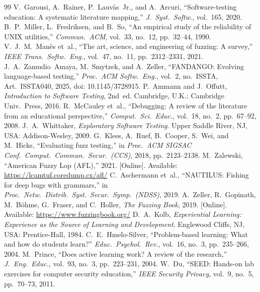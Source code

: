 \documentclass[conference]{IEEEtran}
\begin{document}
\balance

\begin{thebibliography}{99}
 V.~Garousi, A.~Rainer, P.~Lauv\aa{}s~Jr., and A.~Arcuri, ``Software-testing education: A systematic literature mapping,'' \emph{J.\ Syst.\ Softw.}, vol.~165, 2020.
 B.~P.~Miller, L.~Fredriksen, and B.~So, ``An empirical study of the reliability of UNIX utilities,'' \emph{Commun.\ ACM}, vol.~33, no.~12, pp.~32--44, 1990.
 V.~J.~M.~Man\`{e}s et~al., ``The art, science, and engineering of fuzzing: A survey,'' \emph{IEEE Trans.\ Softw.\ Eng.}, vol.~47, no.~11, pp.~2312--2331, 2021.
 J.~A.~Zamudio~Amaya, M.~Smytzek, and A.~Zeller, ``FANDANGO: Evolving language-based testing,'' \emph{Proc.\ ACM Softw.\ Eng.}, vol.~2, no.~ISSTA, Art.~ISSTA040, 2025, doi: 10.1145/3728915.
 P.~Ammann and J.~Offutt, \emph{Introduction to Software Testing}, 2nd~ed. Cambridge, U.K.: Cambridge Univ.\ Press, 2016.
 R.~McCauley et~al., ``Debugging: A review of the literature from an educational perspective,'' \emph{Comput.\ Sci.\ Educ.}, vol.~18, no.~2, pp.~67--92, 2008.
 J.~A.~Whittaker, \emph{Exploratory Software Testing}. Upper Saddle River, NJ, USA: Addison-Wesley, 2009.
 G.~Klees, A.~Ruef, B.~Cooper, S.~Wei, and M.~Hicks, ``Evaluating fuzz testing,'' in \emph{Proc.\ ACM SIGSAC Conf.\ Comput.\ Commun.\ Secur.\ (CCS)}, 2018, pp.~2123--2138.
 M.~Zalewski, ``American Fuzzy Lop (AFL),'' 2021. [Online]. Available: \url{https://lcamtuf.coredump.cx/afl/}
 C.~Aschermann et~al., ``NAUTILUS: Fishing for deep bugs with grammars,'' in \emph{Proc.\ Netw.\ Distrib.\ Syst.\ Secur.\ Symp.\ (NDSS)}, 2019.
 A.~Zeller, R.~Gopinath, M.~B\"{o}hme, G.~Fraser, and C.~Holler, \emph{The Fuzzing Book}, 2019. [Online]. Available: \url{https://www.fuzzingbook.org/}
 D.~A.~Kolb, \emph{Experiential Learning: Experience as the Source of Learning and Development}. Englewood Cliffs, NJ, USA: Prentice-Hall, 1984.
 C.~E.~Hmelo-Silver, ``Problem-based learning: What and how do students learn?'' \emph{Educ.\ Psychol.\ Rev.}, vol.~16, no.~3, pp.~235--266, 2004.
 M.~Prince, ``Does active learning work? A review of the research,'' \emph{J.\ Eng.\ Educ.}, vol.~93, no.~3, pp.~223--231, 2004.
 W.~Du, ``SEED: Hands-on lab exercises for computer security education,'' \emph{IEEE Security Privacy}, vol.~9, no.~5, pp.~70--73, 2011.
\end{thebibliography}
\end{document}
